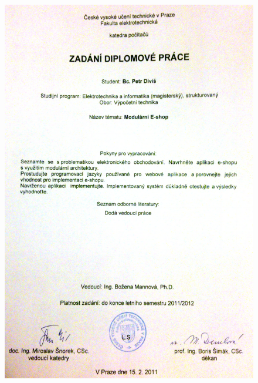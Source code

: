 \documentclass[11pt,twoside,a4paper]{book}
\begin{document}
{
 \oldcleardoublepage \thispagestyle{empty}
\begin{figure}
\begin{center}
\includegraphics[width=15cm]{figures/zadani.png}
\end{center}
\end{figure}
\newpage
}


\coverpagestarts

\end{document}
